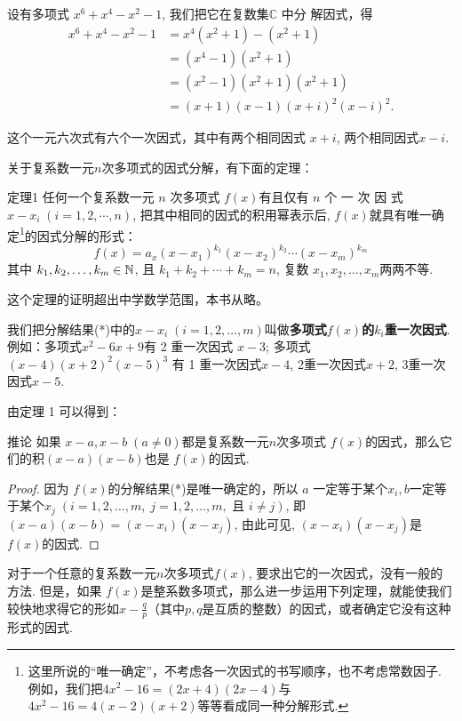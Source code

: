 设有多项式 $x^6+x^4-x^2-1$, 我们把它在复数集$\mathbb{C}$ 中分
解因式，得
\[\begin{split}
    x^{6}+x^{4}-x^{2}-1&=x^{4}(x^{2}+1)-(x^{2}+1)\\
    &=(x^{4}-1)(x^{2}+1)\\
    &=(x^{2}-1)(x^{2}+1)(x^{2}+1)\\
    &=(x+1)(x-1)(x+i)^{2}(x-i)^{2}.
\end{split}\]

这个一元六次式有六个一次因式，其中有两个相同因式
$x+i$, 两个相同因式$x-i$.

关于复系数一元$n$次多项式的因式分解，有下面的定理： 

\begin{thm}
{定理1} 任何一个复系数一元 $n$ 次多项式 $f(x)$有且仅有
$n$ 个 一 次 因 式 $x- x_i\; ( i= 1, 2, \cdots , n)$, 把其中相同的因式的积用幂表示后, $f(x)$就具有唯一确定\footnote{这里所说的“唯一确定”，不考虑各一次因式的书写顺序，也不考虑常数因子. 例如，我们把$4x^2-16=(2x+4)(2x-4)$与$4x^2-16=4(x-2)(x+2)$等等看成同一种分解形式.}的因式分解的形式：
\begin{equation}
    f( x) = a_{x}( x- x_{1}) ^{k_{1}}( x- x_{2}) ^{k_{2}}\cdots ( x- x_{m}) ^{k_{m}} \tag{*}
\end{equation}   
其中 $k_1,k_2,\ldots,k_m\in \mathbb{N}$, 且 $k_1+k_2+\cdots+k_m=n$, 复数 $x_1,x_2,\ldots,x_{m}$两两不等.
\end{thm}

这个定理的证明超出中学数学范围，本书从略。

我们把分解结果(*)中的$x-x_i\; (i=1,2,\ldots,m)$叫做\textbf{多项式$f(x)$的$k_i$重一次因式}. 例如：多项式$x^2-6x+9$有 2 重一次因式 $x-3$; 多项式$(x-4)(x+2)^2(x-5)^3$ 有 1 重一次因式$x- 4$, 2重一次因式$x+ 2$, 3重一次因式$x-5$.

由定理 1 可以得到：

\begin{thm}
{推论} 如果 $x-a,x-b\; (a\neq0)$都是复系数一元$n$次多项式 $f(x)$的因式，那么它们的积$(x-a)(x-b)$也是 $f(x)$的因式.    
\end{thm}

\begin{proof}
因为 $f(x)$的分解结果(*)是唯一确定的，所以 $a$ 一定等于某个$x_i,b$一定等于某个$x_j\; (i=1,2,\ldots,m,\; j=1,2,\ldots,m, \text{ 且 } i\neq j)$, 即$(x-a)(x-b)=(x-x_{i})(x-x_j)$, 由此可见, $(x-x_i)(x-x_j)$是 $f(x)$的因式.    
\end{proof}

对于一个任意的复系数一元$n$次多项式$f(x)$, 要求出它的一次因式，没有一般的方法. 但是，如果 $f(x)$是整系数多项式，那么进一步运用下列定理，就能使我们较快地求得它的形如$x-\frac qp$（其中$p,q$是互质的整数）的因式，或者确定它没有这种形式的因式.


